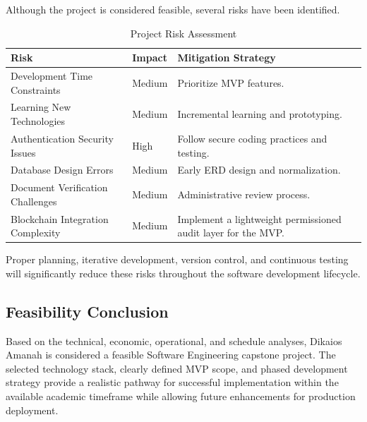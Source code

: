 Although the project is considered feasible, several risks have been identified.

\begin{table}[H]
\centering
\begin{tabular}{|p{6cm}|p{3cm}|p{4cm}|}
\hline
\textbf{Risk} & \textbf{Impact} & \textbf{Mitigation Strategy} \\
\hline
Development Time Constraints & Medium & Prioritize MVP features. \\
\hline
Learning New Technologies & Medium & Incremental learning and prototyping. \\
\hline
Authentication Security Issues & High & Follow secure coding practices and testing. \\
\hline
Database Design Errors & Medium & Early ERD design and normalization. \\
\hline
Document Verification Challenges & Medium & Administrative review process. \\
\hline
Blockchain Integration Complexity & Medium & Implement a lightweight permissioned audit layer for the MVP. \\
\hline
\end{tabular}
\caption{Project Risk Assessment}
\end{table}

Proper planning, iterative development, version control, and continuous testing will significantly reduce these risks throughout the software development lifecycle.


\subsection{Feasibility Conclusion}

Based on the technical, economic, operational, and schedule analyses, Dikaios Amanah is considered a feasible Software Engineering capstone project. The selected technology stack, clearly defined MVP scope, and phased development strategy provide a realistic pathway for successful implementation within the available academic timeframe while allowing future enhancements for production deployment.